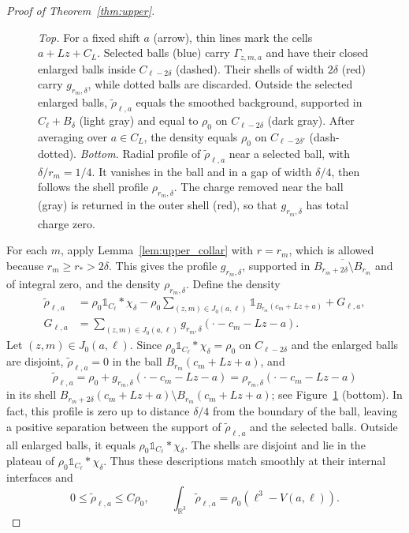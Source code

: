 \documentclass[final,reqno]{amsart}
\theoremstyle{remark}
\theoremstyle{definition}
\renewcommand{\le}{\leqslant}
\renewcommand{\ge}{\geqslant}
\newcommand{\RR}{\mathbb{R}}
\newcommand{\iden}{\mathbb{1}}
\begin{document}
\begin{proof}[Proof of Theorem~\ref{thm:upper}]
\begin{figure}[htp]
{\emph{Top.} For a fixed shift $a$ (arrow), thin lines mark the cells $a+Lz+C_L$.
Selected balls (blue) carry $\Gamma_{z,m,a}$ and have their closed enlarged balls inside $C_{\ell-2\delta}$ (dashed).
Their shells of width $2\delta$ (red) carry $g_{r_m,\delta}$, while dotted balls are discarded.
Outside the selected enlarged balls, $\tilde\rho_{\ell,a}$ equals the smoothed background, supported in $C_\ell+B_\delta$ (light gray) and equal to $\rho_0$ on $C_{\ell-2\delta}$ (dark gray).
After averaging over $a\in C_L$, the density equals $\rho_0$ on $C_{\ell-2\delta'}$ (dash-dotted).
\emph{Bottom.} Radial profile of $\tilde\rho_{\ell,a}$ near a selected ball, with $\delta/r_m=1/4$.
It vanishes in the ball and in a gap of width $\delta/4$, then follows the shell profile $\rho_{r_m,\delta}$.
The charge removed near the ball (gray) is returned in the outer shell (red), so that $g_{r_m,\delta}$ has total charge zero.}
\label{fig:upper_construction}
\end{figure}

For each $m$, apply Lemma~\ref{lem:upper_collar} with $r=r_m$, which is allowed because $r_m\ge r_*>2\delta$. This gives the profile $g_{r_m,\delta}$, supported in $\overline{B_{r_m+2\delta}\setminus B_{r_m}}$ and of integral zero, and the density $\rho_{r_m,\delta}$. Define the density
\begin{equation}\label{eq:upper_expanded_fluid_density}
\begin{aligned}
\tilde\rho_{\ell,a}&=\rho_0\iden_{C_\ell}*\chi_\delta-
\rho_0\sum_{(z,m)\in J_0(a,\ell)}\iden_{B_{r_m}(c_m+Lz+a)}
+G_{\ell,a},\\
G_{\ell,a}&=\sum_{(z,m)\in J_0(a,\ell)}g_{r_m,\delta}(\cdot-c_m-Lz-a).
\end{aligned}
\end{equation}
Let $(z,m)\in J_0(a,\ell)$. Since $\rho_0\iden_{C_\ell}*\chi_\delta=\rho_0$ on $C_{\ell-2\delta}$ and the enlarged balls are disjoint, $\tilde\rho_{\ell,a}=0$ in the ball $B_{r_m}(c_m+Lz+a)$, and
\[
\tilde\rho_{\ell,a}=\rho_0+g_{r_m,\delta}(\cdot-c_m-Lz-a)=\rho_{r_m,\delta}(\cdot-c_m-Lz-a)
\]
in its shell $B_{r_m+2\delta}(c_m+Lz+a)\setminus B_{r_m}(c_m+Lz+a)$; see Figure~\ref{fig:upper_construction} (bottom). In fact, this profile is zero up to distance $\delta/4$ from the boundary of the ball, leaving a positive separation between the support of $\tilde\rho_{\ell,a}$ and the selected balls. Outside all enlarged balls, it equals $\rho_0\iden_{C_\ell}*\chi_\delta$. The shells are disjoint and lie in the plateau of $\rho_0\iden_{C_\ell}*\chi_\delta$. Thus these descriptions match smoothly at their internal interfaces and
\begin{equation}\label{eq:upper_fluid_mass_bound}
0\le \tilde\rho_{\ell,a}\le C\rho_0,
\qquad
\int_{\RR^3}\tilde\rho_{\ell,a}=\rho_0(\ell^3-V(a,\ell)).
\end{equation}



\end{proof}
\end{document}
